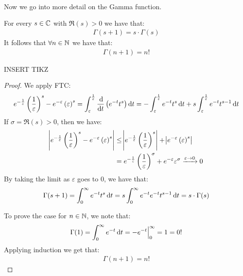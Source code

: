 \setcounter{section}{0}
\setcounter{theorem}{0}



Now we go into more detail on the Gamma function.


\begin{proposition}
For every $s \in \mathbb{C}$ with $\Re (s) >0$ we have that:
\begin{align*}
    \Gamma(s+1) = s\cdot \Gamma(s)
\end{align*}
It follows that $ \forall n \in \mathbb{N} $ we have that:
\begin{align*}
    \Gamma(n+1) = n!
\end{align*}
\end{proposition}

INSERT TIKZ

\begin{proof}
We apply FTC:
\begin{align*}
    e^{-\frac{1}{\varepsilon}} \br{\frac{1}{\varepsilon}}^s - e^{-\varepsilon} \br{\varepsilon}^s = \int_\varepsilon^{\frac{1}{\varepsilon}} \frac{\dif}{\dif t} \br{ e^{-t} t^s } \dif t = - \int_\varepsilon^{\frac{1}{\varepsilon}} e^{-t} t^s \dif t + s \int_\varepsilon^{\frac{1}{\varepsilon}} e^{-t} t^{s-1} \dif t
\end{align*}
If $\sigma = \Re(s) > 0$, then we have:
\begin{align*}
    \abs{e^{-\frac{1}{\varepsilon}} \left( \frac{1}{\varepsilon} \right)^s - e^{-\varepsilon} \left( \varepsilon \right)^s} &\leq \abs{e^{-\frac{1}{\varepsilon}} \left( \frac{1}{\varepsilon} \right)^s} + \abs{ e^{-\varepsilon} \left( \varepsilon \right)^s}\\
    &= e^{-\frac{1}{\varepsilon}} \left( \frac{1}{\varepsilon} \right)^\sigma + e^{- \varepsilon} \varepsilon^\sigma \xrightarrow[]{\varepsilon \to 0} 0
\end{align*}
By taking the limit as $\varepsilon$ goes to $0$, we have that:
\begin{align*}
     \Gamma (s+1) =\int_0^\infty e^{-t} t^s \dif t = s \int_0^\infty e^{-t} e^{-t} t^{s-1} \dif t = s \cdot \Gamma (s)
\end{align*}

To prove the case for $n \in \mathbb{N}$, we note that:
\begin{align*}
    \Gamma(1) = \int_0^\infty e^{-t} \dif t = -e^{-t} \Big|_0^\infty = 1 = 0 !
\end{align*}
Applying induction we get that:
\begin{align*}
    \Gamma(n+1) = n!
\end{align*}
\end{proof}

